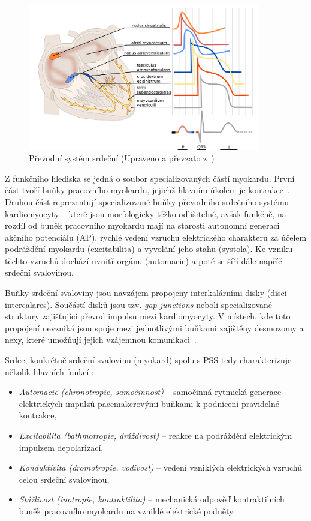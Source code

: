 \begin{figure}[h]
	\begin{center}
		\includegraphics[width=0.9\textwidth]{../assets/anatomy/pss}
		\caption{Převodní systém srdeční (Upraveno a převzato
		z~\cite{ecgpediaConduction})}
		\label{fig:pss}
	\end{center}
\end{figure}

Z funkčního hlediska se jedná o soubor specializovaných částí myokardu. První
část tvoří buňky pracovního myokardu, jejichž hlavním úkolem je
kontrakce~\cite{Cihak2016}. Druhou část reprezentují specializované buňky
převodního srdečního systému -- kardiomyocyty -- které jsou morfologicky těžko
odlišitelné, avšak funkčně, na rozdíl od buněk pracovního myokardu mají na
starosti autonomní generaci akčního potenciálu (AP), rychlé vedení vzruchu
elektrického charakteru za účelem podráždění myokardu (excitabilita) a vyvolání
jeho stahu (systola). Ke vzniku těchto vzruchů dochází uvnitř orgánu (automacie)
a poté se šíří dále napříč srdeční svalovinou. 

Buňky srdeční svaloviny jsou navzájem propojeny interkalárními disky (disci
intercalares). Součástí disků jsou tzv. \textit{gap junctions} neboli
specializované struktury zajišťující převod impulsu mezi kardiomyocyty. V
místech, kde toto propojení nevzniká jsou spoje mezi jednotlivými buňkami
zajištěny desmozomy a nexy, které umožňují jejich vzájemnou
komunikaci~\cite{Dylevsky2013, Stejfa2006}.

Srdce, konkrétně srdeční svalovinu (myokard) spolu s PSS tedy charakterizuje
několik hlavních funkcí \cite{Stejfa2006}:
\begin{itemize}
	\item \textit{Automacie (chronotropie, samočinnost)} -- samočinná rytmická
	      generace elektrických impulzů pacemakerovými buňkami k podnícení
	      pravidelné kontrakce,
	\item \textit{Excitabilita (bathmotropie, dráždivost)} -- reakce na
	      podráždění elektrickým impulzem depolarizací,
	\item \textit{Konduktivita (dromotropie, vodivost)} -- vedení vzniklých
	      elektrických vzruchů celou srdeční svalovinou,
	\item \textit{Stážlivost (inotropie, kontraktilita)} -- mechanická odpověď
	      kontraktilních buněk pracovního myokardu na vzniklé elektrické
	      podněty.
\end{itemize}

